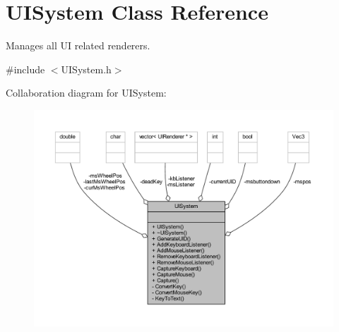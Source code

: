 \hypertarget{class_u_i_system}{\section{U\-I\-System Class Reference}
\label{class_u_i_system}
}


Manages all U\-I related renderers.  




{\ttfamily \#include $<$U\-I\-System.\-h$>$}



Collaboration diagram for U\-I\-System\-:\nopagebreak
\begin{figure}[H]
\begin{center}
\leavevmode
\includegraphics[width=350pt]{class_u_i_system__coll__graph}
\end{center}
\end{figure}
